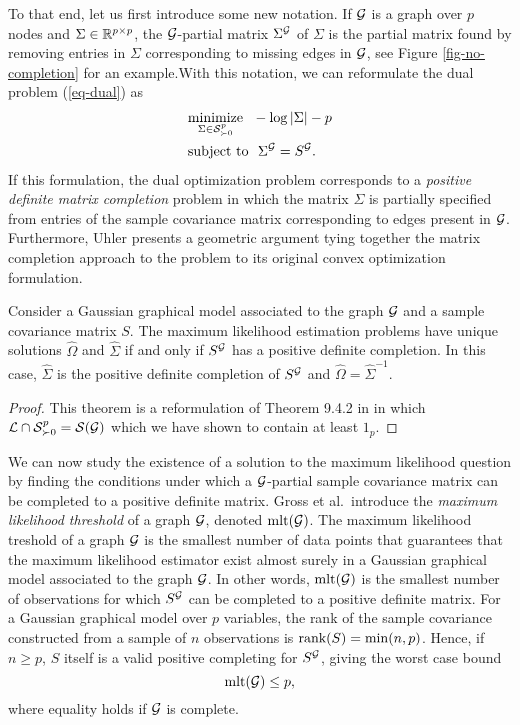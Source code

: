 To that end, let us first introduce some new notation. If ${\mathcal{G}}$ is a graph over $p$ nodes and $\Sigma \in \mathbb{R}^{p\times p}$, the ${\mathcal{G}}$-partial matrix $\Sigma^{\mathcal{G}}$ of $\Sigma$ is the partial matrix found by removing entries in $\Sigma$ corresponding to missing edges in ${\mathcal{G}}$, see Figure \ref{fig-no-completion} for an example.With this notation, we can reformulate the dual problem (\ref{eq-dual}) as
\begin{align} \label{eq-completion}
    \begin{split}    
        &\underset{\Sigma \in \S^p_{\succ 0}}{\textrm{minimize}}\ \  -\log |\Sigma| - p\\
        &\textrm{subject to}\ \ \Sigma^\G = S^\G.
    \end{split}
\end{align}
If this formulation, the dual optimization problem corresponds to a \textit{positive definite matrix completion} problem in which the matrix $\Sigma$ is partially specified from entries of the sample covariance matrix corresponding to edges present in ${\mathcal{G}}$. Furthermore, Uhler \cite[Section 9.4]{maathuis2018handbook} presents a geometric argument tying together the matrix completion approach to the problem to its original convex optimization formulation.

\begin{theorem}
    Consider a Gaussian graphical model associated to the graph ${\mathcal{G}}$ and a sample covariance matrix $S$. The maximum likelihood estimation problems have unique solutions $\hat\Omega$ and $\hat\Sigma$ if and only if $S^{\mathcal{G}}$ has a positive definite completion. In this case, $\hat\Sigma$ is the positive definite completion of $S^{\mathcal{G}}$ and $\hat\Omega = \hat\Sigma^{-1}$.
\end{theorem}
\begin{proof}
    This theorem is a reformulation of Theorem 9.4.2 in \cite{maathuis2018handbook} in which ${\mathcal{L}} \cap {\mathcal{S}}^p_{\succ 0} = {\mathcal{S}}({\mathcal{G}})$ which we have shown to contain at least $1_p$.
\end{proof}

We can now study the existence of a solution to the maximum likelihood question by finding the conditions under which a ${\mathcal{G}}$-partial sample covariance matrix can be completed to a positive definite matrix. Gross et al.\,\cite{10.3150/16-BEJ881} introduce the \textit{maximum likelihood threshold} of a graph ${\mathcal{G}}$, denoted ${\textrm{mlt}}({\mathcal{G}})$. The maximum likelihood treshold of a graph ${\mathcal{G}}$ is the smallest number of data points that guarantees that the maximum likelihood estimator exist almost surely in a Gaussian graphical model associated to the graph ${\mathcal{G}}$. In other words, ${\textrm{mlt}}({\mathcal{G}})$ is the smallest number of observations for which $S^{\mathcal{G}}$ can be completed to a positive definite matrix. For a Gaussian graphical model over $p$ variables, the rank of the sample covariance constructed from a sample of $n$ observations is ${\textrm{rank}}(S) = \min(n, p)$. Hence, if $n \geq p$, $S$ itself is a valid positive completing for $S^{\mathcal{G}}$, giving the worst case bound
\begin{equation} \label{eq-pessimistic-mlt}
    {\textrm{mlt}}({\mathcal{G}}) \leq p,
\end{equation}
where equality holds if ${\mathcal{G}}$ is complete.

